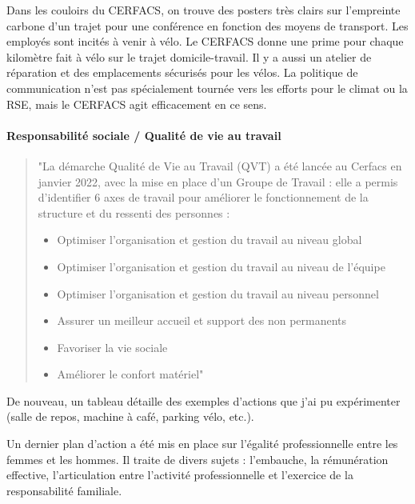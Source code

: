     Dans les couloirs du CERFACS, on trouve des posters très clairs sur l'empreinte carbone d'un trajet pour une conférence en fonction des moyens de transport.
    Les employés sont incités à venir à vélo. Le CERFACS donne une prime pour chaque kilomètre fait à vélo sur le trajet domicile-travail. Il y a aussi un atelier de réparation et des emplacements sécurisés pour les vélos.
    La politique de communication n'est pas spécialement tournée vers les efforts pour le climat ou la RSE, mais le CERFACS agit efficacement en ce sens.

\paragraph{Responsabilité sociale / Qualité de vie au travail}
    \begin{quote}
        \setlength{\leftmargin}{0.5cm} %
        \setlength{\rightmargin}{0.5cm} %
        "La démarche Qualité de Vie au Travail (QVT) a été lancée au Cerfacs en janvier 2022, avec la mise en
        place d’un Groupe de Travail : elle a permis d’identifier 6 axes de travail pour améliorer le
        fonctionnement de la structure et du ressenti des personnes :
        \begin{itemize}
            \item Optimiser l’organisation et gestion du travail au niveau global
            \item Optimiser l’organisation et gestion du travail au niveau de l’équipe
            \item Optimiser l’organisation et gestion du travail au niveau personnel
            \item Assurer un meilleur accueil et support des non permanents
            \item Favoriser la vie sociale
            \item Améliorer le confort matériel"
        \end{itemize}
    \end{quote}

    De nouveau, un tableau  détaille des exemples d'actions que j'ai pu expérimenter (salle de repos, machine à café, parking vélo, etc.).

    Un dernier plan d'action a été mis en place sur l'égalité professionnelle entre les femmes et les hommes. Il traite de divers sujets : l’embauche, la rémunération effective, l’articulation entre l’activité professionnelle et l’exercice de la responsabilité familiale.

